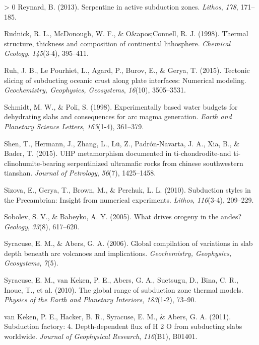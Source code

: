 \documentclass[draft,linenumbers]{agujournal2018}
\newlength{\cslhangindent}
\newenvironment{CSLReferences}[3] %
 {%
  \setlength{\parindent}{0pt}
  \ifodd #1 \everypar{\setlength{\hangindent}{\cslhangindent}}\ignorespaces\fi
  \ifnum #2 > 0
  \setlength{\parskip}{#2\baselineskip}
  \fi
 }%
 {}
\begin{document}
\begin{CSLReferences}{1}{0}
\leavevmode\hypertarget{ref-Reynard2013}{}%
Reynard, B. (2013). {Serpentine in active subduction zones}.
\emph{Lithos}, \emph{178}, 171--185.

\leavevmode\hypertarget{ref-Rudnick1998}{}%
Rudnick, R. L., McDonough, W. F., \& O\&apos;Connell, R. J. (1998).
{Thermal structure, thickness and composition of continental
lithosphere}. \emph{Chemical Geology}, \emph{145}(3-4), 395--411.

\leavevmode\hypertarget{ref-Ruh2015}{}%
Ruh, J. B., Le Pourhiet, L., Agard, P., Burov, E., \& Gerya, T. (2015).
{Tectonic slicing of subducting oceanic crust along plate interfaces:
Numerical modeling}. \emph{Geochemistry, Geophysics, Geosystems},
\emph{16}(10), 3505--3531.

\leavevmode\hypertarget{ref-Schmidt1998}{}%
Schmidt, M. W., \& Poli, S. (1998). {Experimentally based water budgets
for dehydrating slabs and consequences for arc magma generation}.
\emph{Earth and Planetary Science Letters}, \emph{163}(1-4), 361--379.

\leavevmode\hypertarget{ref-Shen2015}{}%
Shen, T., Hermann, J., Zhang, L., Lü, Z., Padrón-Navarta, J. A., Xia,
B., \& Bader, T. (2015). UHP metamorphism documented in
ti-chondrodite-and ti-clinohumite-bearing serpentinized ultramafic rocks
from chinese southwestern tianshan. \emph{Journal of Petrology},
\emph{56}(7), 1425--1458.

\leavevmode\hypertarget{ref-Sizova2010}{}%
Sizova, E., Gerya, T., Brown, M., \& Perchuk, L. L. (2010). {Subduction
styles in the Precambrian: Insight from numerical experiments}.
\emph{Lithos}, \emph{116}(3-4), 209--229.

\leavevmode\hypertarget{ref-Sobolev2005}{}%
Sobolev, S. V., \& Babeyko, A. Y. (2005). What drives orogeny in the
andes? \emph{Geology}, \emph{33}(8), 617--620.

\leavevmode\hypertarget{ref-Syracuse2006}{}%
Syracuse, E. M., \& Abers, G. A. (2006). {Global compilation of
variations in slab depth beneath arc volcanoes and implications}.
\emph{Geochemistry, Geophysics, Geosystems}, \emph{7}(5).

\leavevmode\hypertarget{ref-Syracuse2010}{}%
Syracuse, E. M., van Keken, P. E., Abers, G. A., Suetsugu, D., Bina, C.
R., Inoue, T., et al. (2010). {The global range of subduction zone
thermal models}. \emph{Physics of the Earth and Planetary Interiors},
\emph{183}(1-2), 73--90.

\leavevmode\hypertarget{ref-VanKeken2011}{}%
van Keken, P. E., Hacker, B. R., Syracuse, E. M., \& Abers, G. A.
(2011). {Subduction factory: 4. Depth-dependent flux of H 2 O from
subducting slabs worldwide}. \emph{Journal of Geophysical Research},
\emph{116}(B1), B01401.


\end{CSLReferences}
\end{document}
